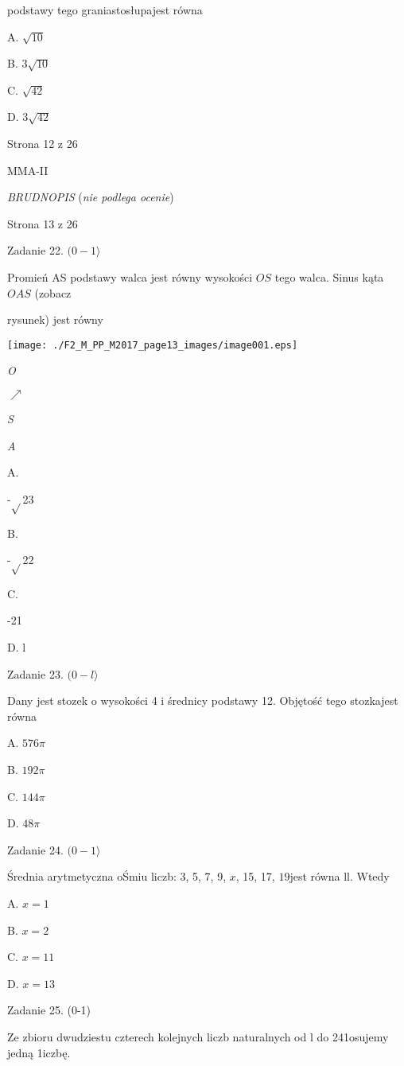 \documentclass[a4paper,12pt]{article}
\begin{document}
podstawy tego graniastosłupajest równa

A. $\sqrt{10}$

B. $3\sqrt{10}$

C. $\sqrt{42}$

D. $3\sqrt{42}$

Strona 12 z 26

MMA-II





{\it BRUDNOPIS} ({\it nie podlega ocenie})

Strona 13 z 26





Zadanie 22. $(0-1\rangle$

Promień AS podstawy walca jest równy wysokości $OS$ tego walca. Sinus kąta $OAS$ (zobacz

rysunek) jest równy
\begin{center}
\texttt{[image: ./F2\_M\_PP\_M2017\_page13\_images/image001.eps]}
\end{center}
{\it O}

$\nearrow$

{\it S}

{\it A}

A.

-$\sqrt{}$23

B.

-$\sqrt{}$22

C.

-21

D. l

Zadanie 23. $(0-l\rangle$

Dany jest stozek o wysokości 4 i średnicy podstawy 12. Objętość tego stozkajest równa

A. $ 576\pi$

B. $ 192\pi$

C. $ 144\pi$

D. $ 48\pi$

Zadanie 24. $(0-1\rangle$

Średnia arytmetyczna oŚmiu liczb: 3, 5, 7, 9, $x$, 15, 17, $19$jest równa ll. Wtedy

A. $x=1$

B. $x=2$

C. $x=11$

D. $x=13$

Zadanie 25. (0-1)

Ze zbioru dwudziestu czterech kolejnych liczb naturalnych od l do 241osujemy jedną 1iczbę.
\end{document}
